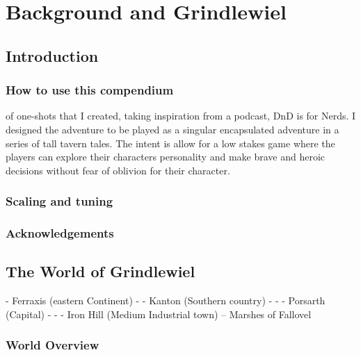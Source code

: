 \documentclass[letterpaper,twocolumn,openany,nodeprecatedcode]{dndbook}
\begin{document}


\frontmatter


\tableofcontents

\mainmatter%

\part{Background and Grindlewiel}

\chapter{Introduction}
\section{How to use this compendium}
 of one-shots that I created, taking inspiration from a podcast, DnD is for Nerds. I designed the adventure to be played as a singular encapsulated adventure in a series of tall tavern tales. The intent is allow for a low stakes game where the players can explore their characters personality and make brave and heroic decisions without fear of oblivion for their character. 
\section{Scaling and tuning}
\section{Acknowledgements}
\chapter{The World of Grindlewiel}
- Ferraxis (eastern Continent)
- - Kanton (Southern country)
- - - Porsarth (Capital)
- - - Iron Hill (Medium Industrial town)
-- Marshes of Fallovel
\section{World Overview}
\end{document}
